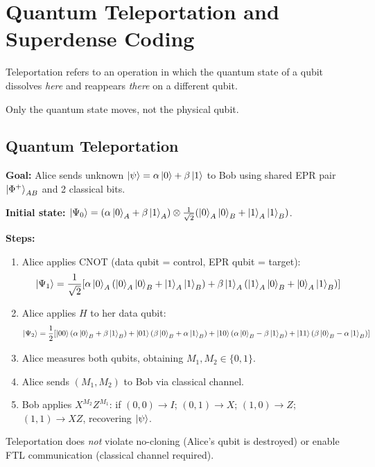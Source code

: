 \documentclass[10pt,a4paper]{article}
\begin{document}
\newpage
\section{Quantum Teleportation and Superdense Coding}
Teleportation refers to an operation in which the quantum state of a qubit dissolves \textit{here} and reappears \textit{there} on a different qubit.

Only the quantum state moves, not the physical qubit.

\subsection{Quantum Teleportation}

\begin{tcolorbox}[algostyle, title={Algorithm: Quantum Teleportation}]
\textbf{Goal:} Alice sends unknown $\ket{\psi}=\alpha\ket{0}+\beta\ket{1}$ to Bob using shared EPR pair $\ket{\Phi^+}_{AB}$ and 2 classical bits.

\textbf{Initial state:} $\ket{\Psi_0}=(\alpha\ket{0}_A+\beta\ket{1}_A)\otimes\frac{1}{\sqrt{2}}(\ket{0}_A\ket{0}_B+\ket{1}_A\ket{1}_B)$.

\textbf{Steps:}
\begin{enumerate}[nosep]
\item Alice applies CNOT (data qubit = control, EPR qubit = target):
\[
\ket{\Psi_1}=\frac{1}{\sqrt{2}}[\alpha\ket{0}_A(\ket{0}_A\ket{0}_B+\ket{1}_A\ket{1}_B)+\beta\ket{1}_A(\ket{1}_A\ket{0}_B+\ket{0}_A\ket{1}_B)]
\]
\item Alice applies $H$ to her data qubit:
\[
\ket{\Psi_2}=\frac{1}{2}[\ket{00}(\alpha\ket{0}_B+\beta\ket{1}_B)+\ket{01}(\beta\ket{0}_B+\alpha\ket{1}_B)+\ket{10}(\alpha\ket{0}_B-\beta\ket{1}_B)+\ket{11}(\beta\ket{0}_B-\alpha\ket{1}_B)]
\]
\item Alice measures both qubits, obtaining $M_1,M_2\in\{0,1\}$.
\item Alice sends $(M_1,M_2)$ to Bob via classical channel.
\item Bob applies $X^{M_2}Z^{M_1}$: if $(0,0)\to I$; $(0,1)\to X$; $(1,0)\to Z$; $(1,1)\to XZ$, recovering $\ket{\psi}$.
\end{enumerate}
Teleportation does \emph{not} violate no-cloning (Alice's qubit is destroyed) or enable FTL communication (classical channel required).
\end{tcolorbox}
\end{document}
